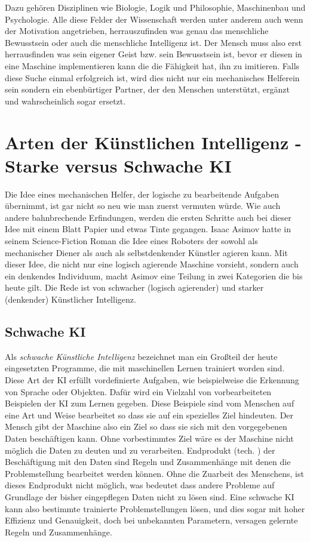 \documentclass[a4paper,12pt,german,ngerman]{report}
\begin{document}
    Dazu gehören Disziplinen wie Biologie, Logik und Philosophie, Maschinenbau und Psychologie.\autocite[56]{buchanan2005very}
    Alle diese Felder der Wissenschaft werden unter anderem auch wenn der Motivation angetrieben, herrauszufinden was genau
    das menschliche Bewusstsein oder auch die menschliche Intelligenz ist. Der Mensch muss also erst herrausfinden was
    sein eigener Geist bzw. sein Bewusstsein ist, bevor er diesen in eine Maschine implementieren kann die die Fähigkeit
    hat, ihn zu imitieren. Falls diese Suche einmal erfolgreich ist, wird dies nicht nur ein mechanisches Helferein
    sein sondern ein ebenbürtiger Partner, der den Menschen unterstützt, ergänzt und wahrscheinlich sogar ersetzt.


    \chapter{Arten der Künstlichen Intelligenz - Starke versus Schwache KI}
    Die Idee eines mechanischen Helfer, der logische zu bearbeitende Aufgaben übernimmt, ist gar nicht so neu wie man
    zuerst vermuten würde. Wie auch andere bahnbrechende Erfindungen, werden die ersten Schritte auch bei dieser Idee
    mit einem Blatt Papier und etwas Tinte gegangen. Isaac Asimov hatte in seinem Science-Fiction Roman 
    die Idee eines Roboters der sowohl als mechanischer Diener als auch als selbstdenkender Künstler agieren kann.\autocite{asimov2000der}
    Mit dieser Idee, die nicht nur eine logisch agierende Maschine vorsieht, sondern auch ein denkendes Individuum, macht Asimov
    eine Teilung in zwei Kategorien die bis heute gilt. Die Rede ist von schwacher (logisch agierender) und starker (denkender) Künstlicher Intelligenz.\\

    \section{Schwache KI}
    Als \emph{schwache Künstliche Intelligenz} bezeichnet man ein Großteil der heute eingesetzten Programme, die mit
    maschinellen Lernen trainiert worden sind.\autocite{ibm2021whatisAI} Diese Art der KI erfüllt vordefinierte Aufgaben,
    wie beispielweise die Erkennung von Sprache oder Objekten. Dafür wird ein Vielzahl von vorbearbeiteten Beispielen der KI
    zum Lernen gegeben. Diese Beispiele sind vom Menschen auf eine Art und Weise bearbeitet so dass sie auf ein spezielles Ziel hindeuten.
    Der Mensch gibt der Maschine also ein Ziel so dass sie sich mit den vorgegebenen Daten beschäftigen kann.
    Ohne vorbestimmtes Ziel wäre es der Maschine nicht möglich die Daten zu deuten und zu verarbeiten.
    Endprodukt (tech. ) der Beschäftigung mit den Daten sind Regeln und Zusammenhänge
    mit denen die Problemstellung bearbeitet werden können. Ohne die Zuarbeit des Menschens, ist dieses Endprodukt nicht
    möglich, was bedeutet dass andere Probleme auf Grundlage der bisher eingepflegen Daten nicht zu lösen sind.
    Eine schwache KI kann also bestimmte trainierte Problemstellungen lösen, und dies sogar mit hoher Effizienz und Genauigkeit, doch bei
    unbekannten Parametern, versagen gelernte Regeln und Zusammenhänge.\\
\end{document}
